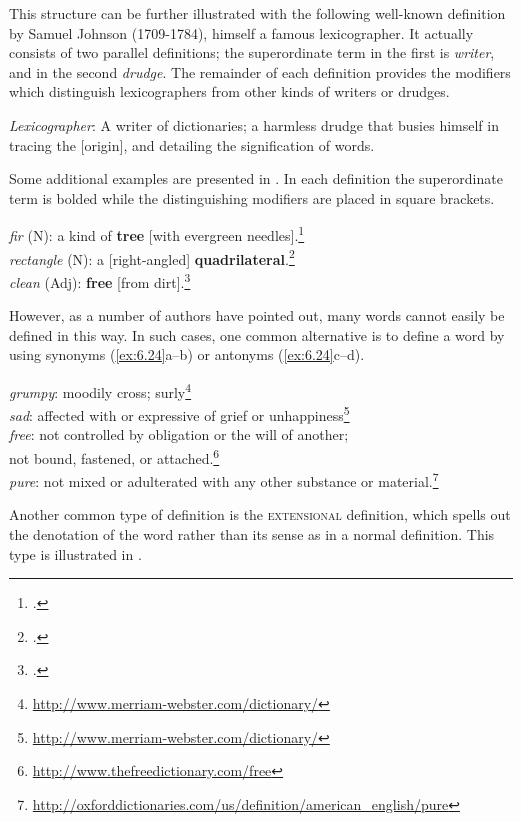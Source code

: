 This structure can be further illustrated with the following well-known definition by Samuel Johnson (1709-1784), himself a famous lexicographer. It actually consists of two parallel definitions; the superordinate term in the first is \textit{writer}, and in the second \textit{drudge}. The remainder of each definition provides the modifiers which distinguish lexicographers from other kinds of writers or drudges.


\ea \label{ex:6.22}
\textit{Lexicographer}: A writer of dictionaries; a harmless drudge that busies himself in tracing the [origin], and detailing the signification of words.
\z


Some additional examples are presented in . In each definition the superordinate term is bolded while the distinguishing modifiers are placed in square brackets.


\ea \label{ex:6.23}
\ea \textit{fir} (N): a kind of \textbf{tree} [with evergreen needles].\footnote{\citet[62]{HartmannJames1998}.}\\
\ex \textit{rectangle} (N): a [right-angled] \textbf{quadrilateral}.\footnote{\citet[219]{Svensén2009}.}\\
\ex \textit{clean} (Adj): \textbf{free} [from dirt].\footnote{\citet[219]{Svensén2009}.}
                       \z
\z


However, as a number of authors have pointed out, many words cannot easily be defined in this way. In such cases, one common alternative is to define a word by using synonyms (\ref{ex:6.24}a--b) or antonyms (\ref{ex:6.24}c--d).


\ea \label{ex:6.24}
\ea \textit{grumpy}: moodily cross; surly\footnote{\url{http://www.merriam-webster.com/dictionary/}}\\
\ex \textit{sad}: affected with or expressive of grief or unhappiness\footnote{\url{http://www.merriam-webster.com/dictionary/}}\\
\ex \textit{free}: not controlled by obligation or the will of another;\\
  not bound, fastened, or attached.\footnote{\url{http://www.thefreedictionary.com/free}} \\
\ex \textit{pure}: not mixed or adulterated with any other substance or material.\footnote{\url{http://oxforddictionaries.com/us/definition/american_english/pure}} 
                       \z
\z


Another common type of definition is the \textsc{extensional} definition, which spells out the denotation of the word rather than its sense as in a normal definition. This type is illustrated in .


